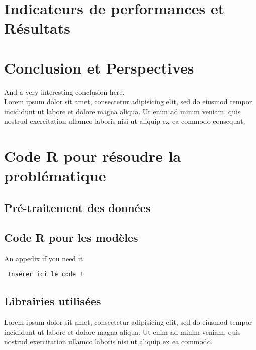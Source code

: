\documentclass[a4paper, oneside, french, 12pt, final]{extreport}
\begin{document}
\chapter{Indicateurs de performances et Résultats}
\label{chap:3}


\chapter*{Conclusion et Perspectives}
\label{chap:conclusion}
%
  And a very interesting conclusion here\@. ~\\
  Lorem ipsum dolor sit amet, consectetur adipisicing elit, sed do eiusmod
  tempor incididunt ut labore et dolore magna aliqua. Ut enim ad minim veniam,
  quis nostrud exercitation ullamco laboris nisi ut aliquip ex ea commodo
  consequat.

\newpage
\appendix
{}

\chapter{Code R pour résoudre la problématique}
\label{chap:appendix}


\section{Pré-traitement des données}
\section{Code R pour les modèles}

 An appedix if you need it.
 
 \begin{verbatim}
 Insérer ici le code !
 \end{verbatim}

\section{Librairies utilisées}
 
  Lorem ipsum dolor sit amet, consectetur adipisicing elit, sed do eiusmod
  tempor incididunt ut labore et dolore magna aliqua. Ut enim ad minim veniam,
  quis nostrud exercitation ullamco laboris nisi ut aliquip ex ea commodo.


\nocite{*}
\end{document}
